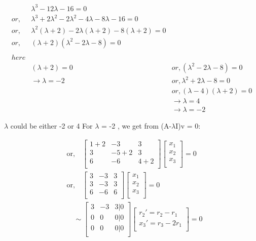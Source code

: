 \documentclass{article}
\begin{document}
\begin{align*}
    &\lambda^3 - 12\lambda - 16 = 0 \\
    or, &\lambda^3 + 2\lambda^2 - 2\lambda^2 -4\lambda - 8\lambda -16 = 0 \\
    or, &\lambda^2(\lambda+2) - 2\lambda(\lambda+2) - 8(\lambda+2) = 0\\
    or, &(\lambda+2)(\lambda^2 -2\lambda -8) = 0\\
    \\
    here \\
    &(\lambda+2) = 0 &or,(\lambda^2 -2\lambda -8) = 0\\
    &\rightarrow\lambda = -2 &or,\lambda^2 + 2\lambda - 8 = 0\\
    &&or,(\lambda-4)(\lambda+2)=0\\
    &&\rightarrow\lambda = 4 \\ &&\rightarrow \lambda = -2
\end{align*}

\newpage

$\lambda$ could be either -2 or 4
For $\lambda$ = -2 , we get from (A-$\lambda$I)v = 0:

\begin{align*}
    &\text{or,} \quad 
    \begin{bmatrix}
        1+2 & -3 & 3 \\
        3 & -5+2 & 3  \\
        6 & -6 & 4+2\\
    \end{bmatrix}
    \begin{bmatrix}
        x_1\\
        x_2\\
        x_3\\
    \end{bmatrix}
    = 0 \\
    &\text{or,} \quad 
    \begin{bmatrix}
        3 & -3 & 3 \\
        3 & -3 & 3  \\
        6 & -6 & 6\\
    \end{bmatrix}
    \begin{bmatrix}
        x_1\\
        x_2\\
        x_3\\
    \end{bmatrix}
    = 0 \\
    &\text{} \quad 
    \sim\begin{bmatrix}
        3 & -3 & 3 |0\\
        0 & 0 & 0  |0\\
        0 & 0 & 0  |0\\
    \end{bmatrix}
    \begin{bmatrix}
        r_2' = r_2 - r_1\\
        x_3' = r_3 - 2r_1\\
    \end{bmatrix}
    = 0
\end{align*}
\end{document}

